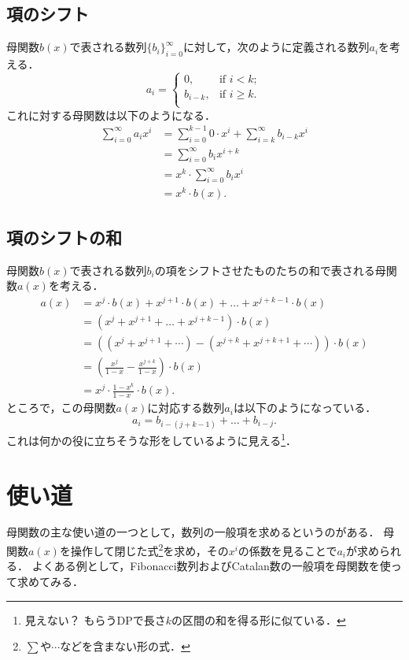 \documentclass{jsarticle}
\begin{document}
\subsection{項のシフト}
母関数$b(x)$で表される数列$\{b_i\}_{i=0}^\infty$に対して，次のように定義される数列$a_i$を考える．
\[
a_i = \begin{cases}
  0, & \text{if }i < k;\\
  b_{i-k}, & \text{if }i \ge k.\\
\end{cases}
\]
これに対する母関数は以下のようになる．
\begin{align*}
  \sum_{i=0}^\infty a_i x^i
  &= \sum_{i=0}^{k-1} 0\cdot x^i + \sum_{i=k}^\infty b_{i-k} x^i\\
  &= \sum_{i=0}^\infty b_i x^{i+k}\\
  &= x^k\cdot \sum_{i=0}^\infty b_i x^i\\
  &= x^k\cdot b(x).
\end{align*}

\subsection{項のシフトの和}
母関数$b(x)$で表される数列$b_i$の項をシフトさせたものたちの和で表される母関数$a(x)$を考える．
\begin{align*}
  a(x) &= x^j\cdot b(x) + x^{j+1}\cdot b(x) + \dots + x^{j+k-1}\cdot b(x)\\
  &= \left(x^j + x^{j+1} + \dots + x^{j+k-1}\right)\cdot b(x)\\
  &= \left((x^j + x^{j+1} + \cdots) - (x^{j+k} + x^{j+k+1} + \cdots)\right)\cdot b(x)\\
  &= \left(\frac{x^j}{1-x} - \frac{x^{j+k}}{1-x}\right) \cdot b(x)\\
  &= x^j\cdot\frac{1-x^k}{1-x^{\phantom{1}}}\cdot b(x).
\end{align*}
ところで，この母関数$a(x)$に対応する数列$a_i$は以下のようになっている．
\[a_i = b_{i-(j+k-1)} + \dots + b_{i-j}.\]
これは何かの役に立ちそうな形をしているように見える\footnote{見えない？ もらうDPで長さ$k$の区間の和を得る形に似ている．}．

\section{使い道}
母関数の主な使い道の一つとして，数列の一般項を求めるというのがある．
母関数$a(x)$を操作して閉じた式\footnote{$\sum$や$\cdots$などを含まない形の式．}を求め，その$x^i$の係数を見ることで$a_i$が求められる．
よくある例として，Fibonacci数列およびCatalan数の一般項を母関数を使って求めてみる．
\end{document}
